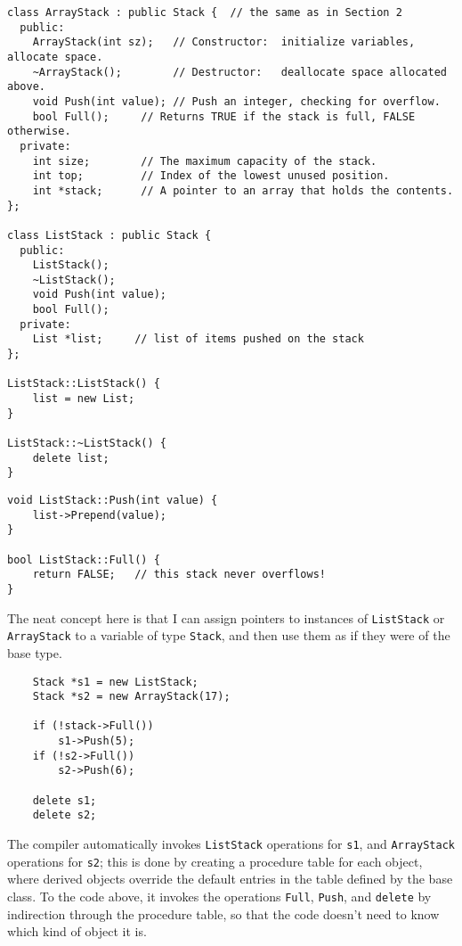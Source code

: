 \begin{verbatim}
class ArrayStack : public Stack {  // the same as in Section 2
  public:
    ArrayStack(int sz);   // Constructor:  initialize variables, allocate space.
    ~ArrayStack();        // Destructor:   deallocate space allocated above.
    void Push(int value); // Push an integer, checking for overflow.
    bool Full();     // Returns TRUE if the stack is full, FALSE otherwise.
  private:
    int size;        // The maximum capacity of the stack.
    int top;         // Index of the lowest unused position.
    int *stack;      // A pointer to an array that holds the contents.
};

class ListStack : public Stack {
  public:
    ListStack(); 
    ~ListStack();
    void Push(int value);
    bool Full();
  private:
    List *list;		// list of items pushed on the stack
};

ListStack::ListStack() { 
    list = new List;
}

ListStack::~ListStack() { 
    delete list; 
}
\end{verbatim}
\newpage
\begin{verbatim}
void ListStack::Push(int value) {
    list->Prepend(value); 
}

bool ListStack::Full() {
    return FALSE; 	// this stack never overflows!
}  
\end{verbatim}

The neat concept here is that I can assign pointers to instances of
{\tt ListStack} or {\tt ArrayStack} to a variable of type {\tt Stack}, and
then use them as if they were of the base type.

\begin{verbatim}
    Stack *s1 = new ListStack;
    Stack *s2 = new ArrayStack(17);

    if (!stack->Full())
        s1->Push(5);
    if (!s2->Full())
        s2->Push(6);

    delete s1;
    delete s2;
\end{verbatim}

The compiler automatically invokes {\tt ListStack} operations
for {\tt s1}, and {\tt ArrayStack} operations for {\tt s2};
this is done by creating a procedure table for each object,
where derived objects override the default entries in the table
defined by the base class.  To the code above, it invokes the
operations {\tt Full}, {\tt Push}, and {\tt delete} by indirection
through the procedure table, so that the code doesn't need to know
which kind of object it is.

